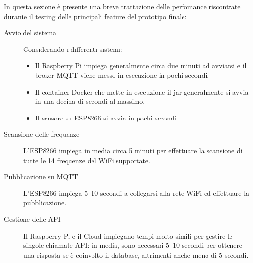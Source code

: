 In questa sezione è presente una breve trattazione delle perfomance riscontrate durante il testing delle principali feature del prototipo finale:

\begin{description}
  \item[Avvio del sistema]
    Considerando i differenti sistemi:
    \begin{itemize}
      \item Il Raspberry Pi impiega generalmente circa due minuti ad avviarsi e il broker MQTT viene messo in esecuzione in pochi secondi.
      \item Il container Docker che mette in esecuzione il jar generalmente si avvia in una decina di secondi al massimo.
      \item Il sensore su ESP8266 si avvia in pochi secondi.
    \end{itemize}
  \item[Scansione delle frequenze]
    L'ESP8266 impiega in media circa 5 minuti per effettuare la scansione di tutte le 14 frequenze del WiFi supportate.
  \item[Pubblicazione su MQTT]
    L'ESP8266 impiega 5--10 secondi a collegarsi alla rete WiFi ed effettuare la pubblicazione.
  \item[Gestione delle API]
    Il Raspberry Pi e il Cloud impiegano tempi molto simili per gestire le singole chiamate API\@:
    in media, sono necessari 5--10 secondi per ottenere una risposta se è coinvolto il database, altrimenti anche meno di 5 secondi.
\end{description}
